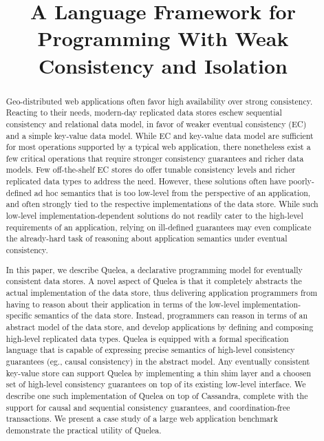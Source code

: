 \documentclass[11pt]{article}
\date{}
\newcommand{\name}{{\sc Quelea}\xspace}
\begin{document}
\title{A Language Framework for Programming With Weak Consistency and
Isolation}


\maketitle

\begin{abstract}
Geo-distributed web applications often favor high availability over
strong consistency. Reacting to their needs, modern-day replicated
data stores eschew sequential consistency and relational data model,
in favor of weaker eventual consistency (EC) and a simple key-value
data model. While EC and key-value data model are sufficient for most
operations supported by a typical web application, there nonetheless
exist a few critical operations that require stronger consistency
guarantees and richer data models. Few off-the-shelf EC stores do
offer tunable consistency levels and richer replicated data types to
address the need. However, these solutions often have poorly-defined
ad hoc semantics that is too low-level from the perspective of an
application, and often strongly tied to the respective implementations
of the data store. While such low-level implementation-dependent
solutions do not readily cater to the high-level requirements of an
application, relying on ill-defined guarantees may even complicate the
already-hard task of reasoning about application semantics under
eventual consistency. 

In this paper, we describe \name, a declarative programming model for
eventually consistent data stores. A novel aspect of \name is that it
completely abstracts the actual implementation of the data store, thus
delivering application programmers from having to reason about their
application in terms of the low-level implementation-specific
semantics of the data store. Instead, programmers can reason in terms
of an abstract model of the data store, and develop applications by
defining and composing high-level replicated data types. \name is
equipped with a formal specification language that is capable of
expressing precise semantics of high-level consistency guarantees
(eg., causal consistency) in the abstract model. Any eventually
consistent key-value store can support \name by implementing a thin
shim layer and a choosen set of high-level consistency guarantees on
top of its existing low-level interface. We describe one such
implementation of \name on top of Cassandra, complete with the support
for causal and sequential consistency guarantees, and
coordination-free transactions. We present a case study of a large web
application benchmark demonstrate the practical utility of \name.



\end{abstract}
\end{document}

